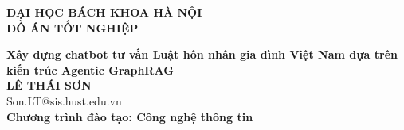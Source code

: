 \documentclass[DoAn.tex]{subfiles}
\begin{document}
\begin{titlepage}
\thispagestyle{empty}
\begin{center}

{\textbf{\large{ĐẠI HỌC BÁCH KHOA HÀ NỘI}}}\\[4cm]

{\textbf{\huge{ ĐỒ ÁN TỐT NGHIỆP}}}\\[1cm]
{\textbf{\Large{Xây dựng chatbot tư vấn Luật hôn nhân gia đình Việt Nam dựa trên kiến trúc Agentic GraphRAG}}\\[0.5cm]

{\textbf{\large{LÊ THÁI SƠN}}}\\
{\large{Son.LT@sis.hust.edu.vn}}\\[0.5cm]

{\textbf{\large{Chương trình đào tạo: Công nghệ thông tin
}}}\\

\vspace{4cm}
\begin{table}[H]
\centering
{}
\end{table}}
\end{center}



\end{titlepage}
\end{document}
